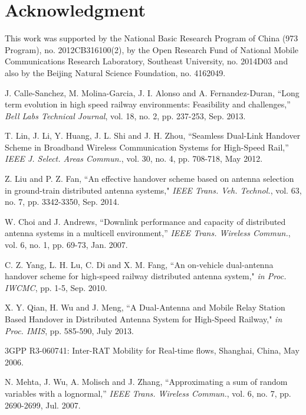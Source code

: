 \documentclass[a4paper,twocolumn,10pt]{IEEEtran}
\begin{document}
\section*{Acknowledgment}
This work was supported by the National
Basic Research Program of China (973 Program), no. 2012CB316100(2), by the Open Research
Fund of National Mobile Communications Research Laboratory, Southeast University, no. 2014D03 and also by the Beijing Natural Science Foundation, no. 4162049.

\begin{thebibliography}{10}

J. Calle-Sanchez, M. Molina-Garcia, J. I. Alonso and A. Fernandez-Duran, ``Long term evolution in high speed railway environments: Feasibility and challenges,'' \emph{Bell Labs Technical Journal}, vol. 18, no. 2, pp. 237-253, Sep. 2013.

T. Lin, J. Li, Y. Huang, J. L. Shi and J. H. Zhou, ``Seamless Dual-Link Handover Scheme in Broadband Wireless Communication Systems for High-Speed Rail,'' \emph{IEEE J. Select. Areas Commun.}, vol. 30, no. 4, pp. 708-718, May 2012.

Z. Liu and P. Z. Fan, ``An effective handover scheme based on antenna selection in ground-train distributed antenna systems," \emph{IEEE Trans. Veh. Technol.}, vol. 63, no. 7, pp. 3342-3350, Sep. 2014.

W. Choi and J. Andrews, ``Downlink performance and capacity of distributed antenna systems in a multicell environment,'' \emph{IEEE Trans. Wireless Commun.}, vol. 6, no. 1, pp. 69-73, Jan. 2007.

C. Z. Yang, L. H. Lu, C. Di and X. M. Fang, ``An on-vehicle dual-antenna handover scheme for high-speed railway distributed antenna system," \emph{in Proc. IWCMC}, pp. 1-5, Sep. 2010.


X. Y. Qian, H. Wu and J. Meng, ``A Dual-Antenna and Mobile Relay Station Based Handover in Distributed Antenna System for High-Speed Railway," \emph{in Proc. IMIS}, pp. 585-590, July 2013.

3GPP R3-060741: Inter-RAT Mobility for Real-time flows, Shanghai, China, May 2006.

N. Mehta, J. Wu, A. Molisch and J. Zhang, ``Approximating a sum of random variables with a lognormal,'' \emph{IEEE Trans. Wireless Commun.}, vol. 6, no. 7, pp. 2690-2699, Jul. 2007.




\end{thebibliography}
\end{document}
